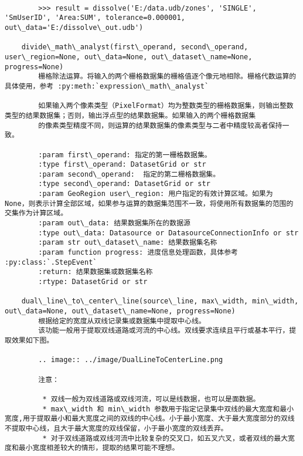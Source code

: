 \documentclass[11pt]{article}
\begin{document}
\begin{Verbatim}[commandchars=\\\{\}]
        
        >>> result = dissolve('E:/data.udb/zones', 'SINGLE', 'SmUserID', 'Area:SUM', tolerance=0.000001, out\_data='E:/dissolve\_out.udb')
    
    divide\_math\_analyst(first\_operand, second\_operand, user\_region=None, out\_data=None, out\_dataset\_name=None, progress=None)
        栅格除法运算。将输入的两个栅格数据集的栅格值逐个像元地相除。栅格代数运算的具体使用，参考 :py:meth:`expression\_math\_analyst`
        
        如果输入两个像素类型（PixelFormat）均为整数类型的栅格数据集，则输出整数类型的结果数据集；否则，输出浮点型的结果数据集。如果输入的两个栅格数据集
        的像素类型精度不同，则运算的结果数据集的像素类型与二者中精度较高者保持一致。
        
        :param first\_operand: 指定的第一栅格数据集。
        :type first\_operand: DatasetGrid or str
        :param second\_operand:  指定的第二栅格数据集。
        :type second\_operand: DatasetGrid or str
        :param GeoRegion user\_region: 用户指定的有效计算区域。如果为 None，则表示计算全部区域，如果参与运算的数据集范围不一致，将使用所有数据集的范围的交集作为计算区域。
        :param out\_data: 结果数据集所在的数据源
        :type out\_data: Datasource or DatasourceConnectionInfo or str
        :param str out\_dataset\_name: 结果数据集名称
        :param function progress: 进度信息处理函数，具体参考 :py:class:`.StepEvent`
        :return: 结果数据集或数据集名称
        :rtype: DatasetGrid or str
    
    dual\_line\_to\_center\_line(source\_line, max\_width, min\_width, out\_data=None, out\_dataset\_name=None, progress=None)
        根据给定的宽度从双线记录集或数据集中提取中心线。
        该功能一般用于提取双线道路或河流的中心线。双线要求连续且平行或基本平行，提取效果如下图。
        
        .. image:: ../image/DualLineToCenterLine.png
        
        注意：
        
         * 双线一般为双线道路或双线河流，可以是线数据，也可以是面数据。
         * max\_width 和 min\_width 参数用于指定记录集中双线的最大宽度和最小宽度,用于提取最小和最大宽度之间的双线的中心线。小于最小宽度、大于最大宽度部分的双线不提取中心线，且大于最大宽度的双线保留，小于最小宽度的双线丢弃。
         * 对于双线道路或双线河流中比较复杂的交叉口，如五叉六叉，或者双线的最大宽度和最小宽度相差较大的情形，提取的结果可能不理想。
        

\end{Verbatim}
\end{document}
